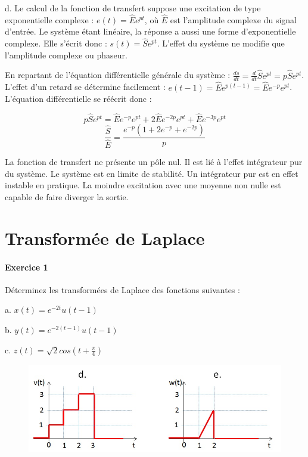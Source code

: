 \documentclass[11pt]{report}
\begin{document}
 	d. Le calcul de la fonction de transfert suppose une excitation de type exponentielle complexe : $e(t)=\hat{E}e^{pt}$, où $\hat{E}$ est l'amplitude complexe du signal d'entrée. Le système étant linéaire, la réponse a aussi une forme d'exponentielle complexe. Elle s'écrit donc : $s(t)=\hat{S}e^{pt}$. L'effet du système ne modifie que l'amplitude complexe ou phaseur.
 	
 	En repartant de l'équation différentielle générale du système : $\frac{ds}{dt}=\frac{d}{dt}\hat{S}e^{pt}=p\hat{S}e^{pt}$. L'effet d'un retard se détermine facilement : $e(t-1)=\hat{E}e^{p(t-1)}=\hat{E}e^{-p}e^{pt}$. L'équation différentielle se réécrit donc :
 	
 	\begin{equation*}
 	p\hat{S}e^{pt}=\hat{E}e^{-p}e^{pt}+2\hat{E}e^{-2p}e^{pt}+\hat{E}e^{-3p}e^{pt}
 	\end{equation*}
 	\begin{equation*}
 	\frac{\hat{S}}{\hat{E}}=\frac{e^{-p}(1+2e^{-p}+e^{-2p})}{p}
 	\end{equation*}
 	
 	La fonction de transfert ne présente un pôle nul.  Il est lié à l'effet intégrateur pur du système. Le système est en limite de stabilité. Un intégrateur pur est en effet instable en pratique. La moindre excitation avec une moyenne non nulle est capable de faire diverger la sortie.
 	
 	
	
	\newpage
	
	\chapter{Transformée de Laplace}
	
	
	\subsubsection{Exercice 1}
	
	Déterminez les transformées de Laplace des fonctions suivantes :
	
	a. $x(t)=e^{-2t}u(t-1)$
	
	b. $y(t)=e^{-2(t-1)}u(t-1)$
	
	c. $z(t) = \sqrt{2}cos(t+\frac{\pi}{4})$
	
	\begin{figure}[h!]
		\centering
		\includegraphics[scale=0.5]{images/Exo_2_1_a.jpg} 
	\end{figure} 
\end{document}
